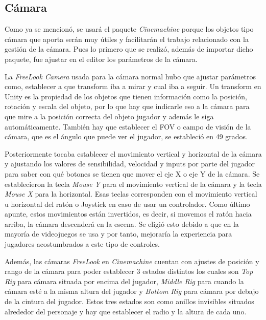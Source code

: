 \subsection{Cámara}

Como ya se mencionó, se usará el paquete \textit{Cinemachine} porque los objetos tipo cámara que aporta serán muy útiles y facilitarán el trabajo relacionado con la gestión de la cámara. Pues lo primero que se realizó, además de importar dicho paquete, fue ajustar en el editor los parámetros de la cámara. 

La \textit{FreeLook Camera} usada para la cámara normal hubo que ajustar parámetros como, establecer a que transform iba a mirar y cual iba a seguir. Un transform en Unity es la propiedad de los objetos que tienen información como la posición, rotación y escala del objeto, por lo que hay que indicarle eso a la cámara para que mire a la posición correcta del objeto jugador y además le siga automáticamente. También hay que establecer el FOV o campo de visión de la cámara, que es el ángulo que puede ver el jugador, se estableció en 49 grados.

Posteriormente tocaba establecer el movimiento vertical y horizontal de la cámara y ajustando los valores de sensibilidad, velocidad y inputs por parte del jugador para saber con qué botones se tienen que mover el eje X o eje Y de la cámara. Se establecieron la tecla \textit{Mouse Y} para el movimiento vertical de la cámara y la tecla \textit{Mouse X} para la horizontal. Esas teclas corresponden con el movimiento vertical u horizontal del ratón o Joystick en caso de usar un controlador. Como último apunte, estos movimientos están invertidos, es decir, si movemos el ratón hacia arriba, la cámara descenderá en la escena. Se eligió esto debido a que en la mayoría de videojuegos se usa y por tanto, mejoraría la experiencia para jugadores acostumbrados a este tipo de controles.

Además, las cámaras \textit{FreeLook} en \textit{Cinemachine} cuentan con ajustes de posición y rango de la cámara para poder establecer 3 estados distintos los cuales son \textit{Top Rig} para cámara situada por encima del jugador, \textit{Middle Rig} para cuando la cámara esté a la misma altura del jugador y \textit{Bottom Rig} para cámara por debajo de la cintura del jugador. Estos tres estados son como anillos invisibles situados alrededor del personaje y hay que establecer el radio y la altura de cada uno. 

